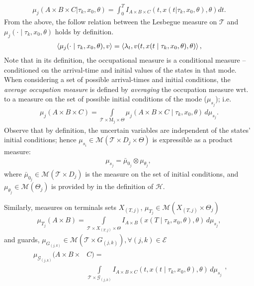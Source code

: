 \small
\begin{align}
\mu_j(A\times B\times C| \tau_k ,x_0,\theta)=\int_{0}^T I_{A\times B\times C}(t,x(t|\tau_k,x_0,\theta),\theta)dt.
\end{align}
\normalsize
From the above, the follow relation between the Lesbegue measure on $\mathcal T$ and $\mu_j(\cdot\mid \tau_k,x_0,\theta)$ holds by definition.
\begin{align}
\left\langle \mu_j(\cdot\mid \tau_k,x_0,\theta),v\right\rangle=\left\langle \lambda_t,v(t,x(t\mid \tau_k,x_0,\theta),\theta)\right\rangle,
\label{eq:mu_lambda}
\end{align}
Note that in its definition, the occupational measure is a conditional measure -- conditioned on the arrival-time and initial values of the states in that mode.
When considering a set of possible arrival-times and initial conditions, the {\em average occupation measure} is defined by {\em averaging} the occupation measure wrt. to a measure on the set of possible initial conditions of the mode ($\mu_{s_j}$); i.e.
\begin{align}
\mu_j(A\times B\times C)=\int\limits_{\mathcal T\times \mathrm M_j\times \Theta}\mu_j(A\times B\times C\mid \tau_k,x_0,\theta)\,d \mu_{s_j}.
\label{eq:mu_avg}
\end{align}
\normalsize
Observe that by definition, the uncertain variables are independent of the states' initial conditions; hence $\mu_{s_i}\in \mathcal M(\mathcal T\times D_j\times \Theta)$ is expressible as a product measure:
\begin{align}
\mu_{s_j}=\bar\mu_{0_j}\otimes \mu_{\theta_j},\
\end{align}
where $\bar \mu_{0_j}\in \mathcal M(\mathcal T\times D_j)$ is the measure on the set of initial conditions, and $\mu_{\theta_j}\in \mathcal M(\Theta_j)$ is provided by in the definition of $\mathcal H$.\par
Similarly, measures on terminals sets $X_{(T,j)}$, $\mu_{T_j}\in \mathcal M(X_{(T,j)}\times \Theta_j)$
\begin{align}
\mu_{T_j}(A\times B)=\int\limits_{\mathcal T\times X_{(T,j)}\times \Theta}I_{A\times B}(x(T\mid \tau_k,x_0,\theta),\theta)\,d\mu_{s_{j}},
\end{align}
and guards, $\mu_{ G_{(j,k)}}\in \mathcal M(\mathcal T\times  G_{(j,k)}),\forall(j,k)\in \mathcal E$
\begin{align}
\begin{split}
\mu_{\mathcal G_{(j,k)}}(A\times B\times& C)=\\&\int\limits_{\mathcal T\times \mathcal G_{(j,k)}}I_{A\times B\times C}(t,x(t\mid \tau_k,x_0,\theta),\theta)\,d\mu_{s_{j}}
\end{split},
\end{align}
